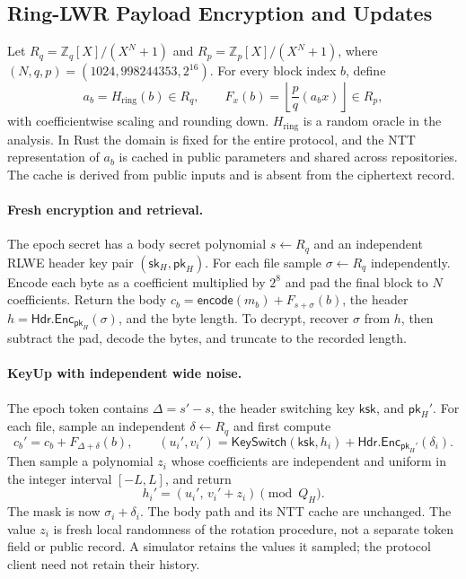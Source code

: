 \subsection{Ring-LWR Payload Encryption and Updates}
\label{sec:ue}

Let $R_q=\mathbb Z_q[X]/(X^N+1)$ and $R_p=\mathbb Z_p[X]/(X^N+1)$, where $(N,q,p)=(1024,998244353,2^{16})$. For every block index $b$, define
\[
a_b=H_{\mathrm{ring}}(b)\in R_q,\qquad
F_x(b)=\left\lfloor \frac{p}{q}(a_bx)\right\rfloor\in R_p,
\]
with coefficientwise scaling and rounding down. $H_{\mathrm{ring}}$ is a random oracle in the analysis. In Rust the domain is fixed for the entire protocol, and the NTT representation of $a_b$ is cached in public parameters and shared across repositories. The cache is derived from public inputs and is absent from the ciphertext record.

\paragraph{Fresh encryption and retrieval.}
The epoch secret has a body secret polynomial $s\gets R_q$ and an independent RLWE header key pair $(\mathsf{sk}_H,\mathsf{pk}_H)$. For each file sample $\sigma\gets R_q$ independently. Encode each byte as a coefficient multiplied by $2^8$ and pad the final block to $N$ coefficients. Return the body $c_b=\mathsf{encode}(m_b)+F_{s+\sigma}(b)$, the header $h=\mathsf{Hdr.Enc}_{\mathsf{pk}_H}(\sigma)$, and the byte length. To decrypt, recover $\sigma$ from $h$, then subtract the pad, decode the bytes, and truncate to the recorded length.

\paragraph{KeyUp with independent wide noise.}
The epoch token contains $\Delta=s'-s$, the header switching key $\mathsf{ksk}$, and $\mathsf{pk}_H'$. For each file, sample an independent $\delta\gets R_q$ and first compute
\[
 c_b'=c_b+F_{\Delta+\delta}(b),\qquad
 (u_i',v_i')=\mathsf{KeySwitch}(\mathsf{ksk},h_i)+\mathsf{Hdr.Enc}_{\mathsf{pk}_H'}(\delta_i).
\]
Then sample a polynomial $z_i$ whose coefficients are independent and uniform in the integer interval $[-L,L]$, and return
\[
 h_i'=(u_i',\,v_i'+z_i)\pmod{Q_H}.
\]
The mask is now $\sigma_i+\delta_i$. The body path and its NTT cache are unchanged. The value $z_i$ is fresh local randomness of the rotation procedure, not a separate token field or public record. A simulator retains the values it sampled; the protocol client need not retain their history.

